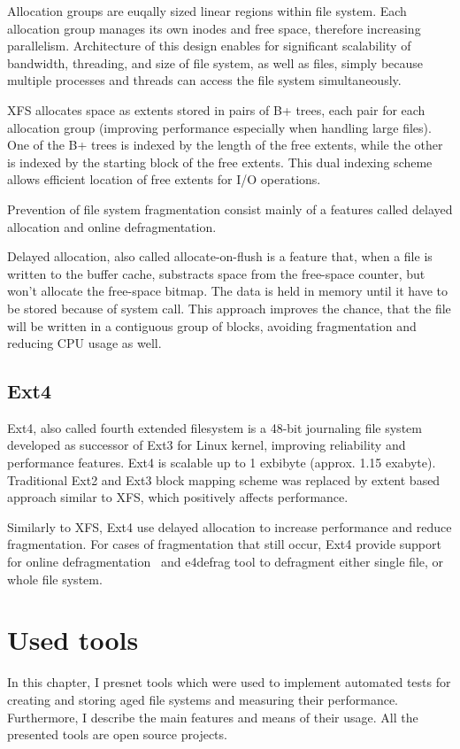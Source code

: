 \documentclass[
  color, %
  table, %
  lof,   %
  lot,   %
]{fithesis3}
\begin{document}
Allocation groups are euqally sized linear regions within file system. Each allocation group manages its own inodes and free space, therefore increasing parallelism. Architecture of this design enables for significant scalability of bandwidth, threading, and size of file system, as well as files, simply because multiple processes and threads can access the file system simultaneously.

XFS allocates space as extents stored in pairs of B+ trees, each pair for each allocation group (improving performance especially when handling large files). One of the B+ trees is indexed by the length of the free extents, while the other is indexed by the starting block of the free extents. This dual indexing scheme allows efficient location of free extents for I/O operations.

Prevention of file system fragmentation consist mainly of a features called delayed allocation and online defragmentation.

Delayed allocation, also called allocate-on-flush is a feature that, when a file is written to the buffer cache, substracts space from the free-space counter, but won't allocate the free-space bitmap. The data is held in memory until it have to be stored because of system call. This approach improves the chance, that the file will be written in a contiguous group of blocks, avoiding fragmentation and reducing CPU usage as well.

\section{Ext4}
Ext4, also called fourth extended filesystem is a 48-bit journaling file system developed as successor of Ext3 for Linux kernel, improving reliability and performance features. Ext4 is scalable up to 1 exbibyte (approx. 1.15 exabyte). Traditional Ext2 and Ext3 block mapping scheme was replaced by extent based approach similar to XFS, which positively affects performance.

Similarly to XFS, Ext4 use delayed allocation to increase performance and reduce fragmentation. For cases of fragmentation that still occur, Ext4 provide support for online defragmentation~\cite{sato2007:ext4} and e4defrag tool to defragment either single file, or whole file system.

\chapter{Used tools}
In this chapter, I presnet tools which were used to implement automated tests for creating and storing aged file systems and measuring their performance. Furthermore, I describe the main features and means of their usage. All the presented tools are open source projects.
\end{document}

